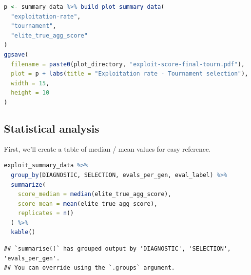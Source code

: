 \documentclass[
]{book}
\begin{document}
\begin{lstlisting}[language=R]
p <- summary_data %>% build_plot_summary_data(
  "exploitation-rate",
  "tournament",
  "elite_true_agg_score"
)
ggsave(
  filename = paste0(plot_directory, "exploit-score-final-tourn.pdf"),
  plot = p + labs(title = "Exploitation rate - Tournament selection"),
  width = 15,
  height = 10
)
\end{lstlisting}

\hypertarget{statistical-analysis}{%
\subsection{Statistical analysis}\label{statistical-analysis}}

First, we'll create a table of median / mean values for easy reference.

\begin{lstlisting}[language=R]
exploit_summary_data %>%
  group_by(DIAGNOSTIC, SELECTION, evals_per_gen, eval_label) %>%
  summarize(
    score_median = median(elite_true_agg_score),
    score_mean = mean(elite_true_agg_score),
    replicates = n()
  ) %>%
  kable()
\end{lstlisting}

\begin{lstlisting}
## `summarise()` has grouped output by 'DIAGNOSTIC', 'SELECTION', 'evals_per_gen'.
## You can override using the `.groups` argument.
\end{lstlisting}
\end{document}

